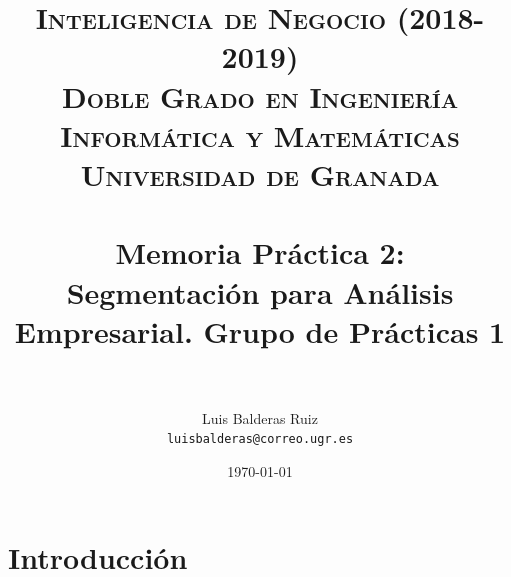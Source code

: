 
\usepackage{graphicx}
\graphicspath{ {./images/} }


\title{	
	\normalfont \normalsize 
	\textsc{\textbf{Inteligencia de Negocio (2018-2019)} \\ Doble Grado en Ingeniería Informática y Matemáticas \\ Universidad de Granada} \\ [25pt] %
	\horrule{0.5pt} \\[0.4cm] %
	\huge Memoria Práctica 2: \\ Segmentación para Análisis Empresarial. Grupo de Prácticas 1 \\ %
	\horrule{2pt} \\[0.5cm] %
}

\author{Luis Balderas Ruiz \\ \texttt{luisbalderas@correo.ugr.es}} 

\date{\normalsize\today} %



	
\maketitle %
	
\newpage %
	
\tableofcontents %
	
\listoffigures

	
\newpage




\section{Introducción}

